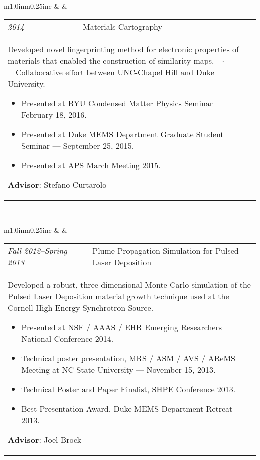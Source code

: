 \documentclass[11pt]{article}
\begin{document}
\begin{center}
\begin{tabular}{m{1.0in}m{0.25in}c}
 & & 
\begin{tabular}{m{0.85in}m{0.15in}m{3.75in}}
\textit{\small{2014}} & & Materials Cartography \\ \multicolumn{3}{p{4.75in}}{\footnotesize{Developed novel fingerprinting method for electronic properties of materials that enabled the construction of similarity maps.\ \ $\cdotp$\ \ Collaborative effort between UNC-Chapel Hill and Duke University. \noindent\begin{itemize}[leftmargin=*] \item Presented at BYU Condensed Matter Physics Seminar --- February 18, 2016. \item Presented at Duke MEMS Department Graduate Student Seminar --- September 25, 2015. \item Presented at APS March Meeting 2015. \end{itemize} \textbf{Advisor}: Stefano Curtarolo}} 
\end{tabular} \\ 
\end{tabular}
\end{center}

\begin{center}
\begin{tabular}{m{1.0in}m{0.25in}c}
 & & 
\begin{tabular}{m{0.85in}m{0.15in}m{3.75in}}
\textit{\small{Fall 2012--Spring 2013}} & & Plume Propagation Simulation for Pulsed Laser Deposition \\ \multicolumn{3}{p{4.75in}}{\footnotesize{Developed a robust, three-dimensional Monte-Carlo simulation of the Pulsed Laser Deposition material growth technique used at the Cornell High Energy Synchrotron Source. \noindent\begin{itemize}[leftmargin=*] \item Presented at NSF / AAAS / EHR Emerging Researchers National Conference 2014. \item Technical poster presentation, MRS / ASM / AVS / AReMS Meeting at NC State University --- November 15, 2013. \item \textcolor{NavyBlue}{Technical Poster and Paper Finalist}, SHPE Conference 2013. \item \textcolor{NavyBlue}{Best Presentation Award}, Duke MEMS Department Retreat 2013. \end{itemize} \textbf{Advisor}: Joel Brock}} 
\end{tabular} \\ 
\end{tabular}
\end{center}
\end{document}
